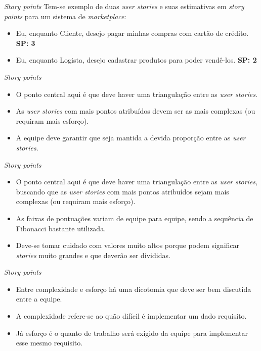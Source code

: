 \documentclass[11pt]{beamer}
\begin{document}
    \begin{frame}{\textit{Story points}}
        Tem-se exemplo de duas \textit{user stories} e suas estimativas em \textit{story points} para um sistema de \textit{marketplace}:
        \begin{itemize}
            \item Eu, enquanto Cliente, desejo pagar minhas compras com cartão de crédito. \textbf{SP: 3} 
            \item Eu, enquanto Logista, desejo cadastrar produtos para poder vendê-los. \textbf{SP: 2}
        \end{itemize}
    \end{frame}

    \begin{frame}{\textit{Story points}}
        \begin{itemize}
            \item O ponto central aqui é que deve haver uma triangulação entre as \textit{user stories}.
            \item As \textit{user stories} com mais pontos atribuídos devem ser as mais complexas (ou requiram mais esforço).
            \item A equipe deve garantir que seja mantida a devida proporção entre as \textit{user stories}.
        \end{itemize}
    \end{frame}

    \begin{frame}{\textit{Story points}}
        \begin{itemize}
            \item O ponto central aqui é que deve haver uma triangulação entre as \textit{user stories}, buscando que as \textit{user stories} com mais pontos atribuídos sejam mais complexas (ou requiram mais esforço).
            \item As faixas de pontuações variam de equipe para equipe, sendo a sequência de Fibonacci bastante utilizada.
            \item Deve-se tomar cuidado com valores muito altos porque podem significar \textit{stories} muito grandes e que deverão ser divididas.
        \end{itemize}
    \end{frame}

    \begin{frame}{\textit{Story points}}
        \begin{itemize}
            \item Entre complexidade e esforço há uma dicotomia que deve ser bem discutida entre a equipe.
            \item A complexidade refere-se ao quão difícil é implementar um dado requisito.
            \item Já esforço é o quanto de trabalho será exigido da equipe para implementar esse mesmo requisito.
        \end{itemize}
    \end{frame}
\end{document}
